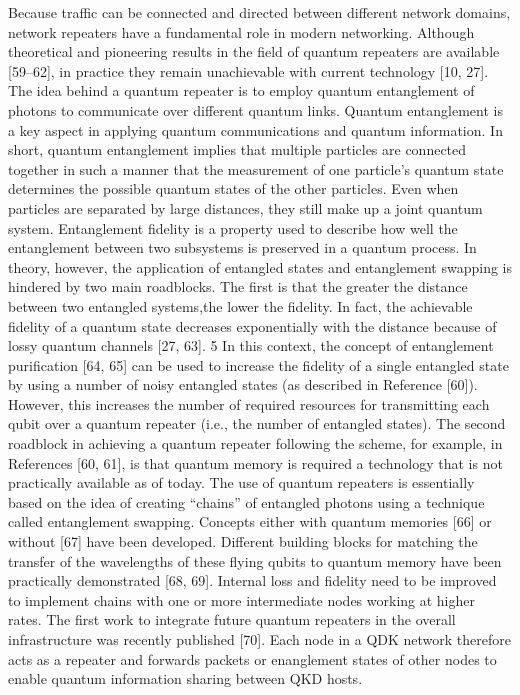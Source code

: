 Because traffic can be connected and directed between different network domains, network repeaters have a fundamental role in modern networking. Although theoretical and pioneering results in the field of quantum repeaters are available [59–62], in practice they remain unachievable with current technology [10, 27]. The idea behind a quantum repeater is to employ quantum entanglement of photons to communicate over different quantum links. Quantum entanglement is a key aspect in applying quantum communications and quantum information. In short, quantum entanglement implies that multiple particles are connected together in such a manner that the measurement of one particle’s quantum state determines the possible quantum states of the other particles. Even when particles are separated by large distances, they still make up a joint quantum system. Entanglement fidelity is a property used to describe how well the entanglement between two subsystems is preserved in a quantum process.
In theory, however, the application of entangled states and entanglement swapping is hindered by two main roadblocks. The first is that the greater the distance between two entangled systems,the lower the fidelity. In fact, the achievable fidelity of a quantum state decreases exponentially with the distance because of lossy quantum channels [27, 63]. 5 In this context, the concept of entanglement purification [64, 65] can be used to increase the fidelity of a single entangled state by using a number of noisy entangled states (as described in Reference [60]). However, this increases the number of required resources for transmitting each qubit over a quantum repeater (i.e., the number of entangled states). The second roadblock in achieving a quantum repeater following the scheme, for example, in References [60, 61], is that quantum memory is required a technology that is not practically available as of today. The use of quantum repeaters is essentially based on the idea of creating “chains” of entangled photons using a technique called entanglement swapping. Concepts either with quantum memories [66] or without [67] have been developed. Different building blocks for matching the transfer of the wavelengths of these flying qubits to quantum memory have been practically demonstrated [68, 69]. Internal loss and fidelity need to be improved to implement chains with one or more intermediate nodes working at higher rates. The first work to integrate future quantum repeaters in the overall infrastructure was recently published [70]. Each node in a QDK network therefore acts as a repeater and forwards packets or enanglement states of other nodes to enable quantum information sharing between QKD hosts.

